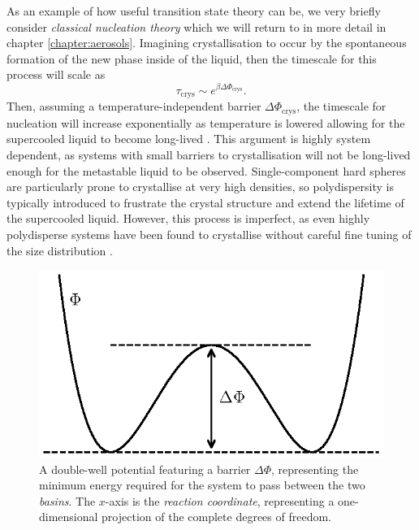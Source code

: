 \documentclass[11pt,twoside]{report}
\begin{document}
As an example of how useful transition state theory can be, we very briefly consider \emph{classical nucleation theory} which we will return to in more detail in chapter \ref{chapter:aerosols}.
Imagining crystallisation to occur by the spontaneous formation of the new phase inside of the liquid, then the timescale for this process will scale as
\begin{equation*}
  \tau_\mathrm{crys} \sim e^{ \beta \Delta \Phi_\mathrm{crys}}.
\end{equation*}
Then, assuming a temperature-independent barrier $\Delta \Phi_\mathrm{crys}$, the timescale for nucleation will increase exponentially as temperature is lowered allowing for the supercooled liquid to become long-lived%
\cite{CavagnaPR2009}.
This argument is highly system dependent, as systems with small barriers to crystallisation will not be long-lived enough for the metastable liquid to be observed.
Single-component hard spheres are particularly prone to crystallise at very high densities, so polydispersity is typically introduced to frustrate the crystal structure and extend the lifetime of the supercooled liquid.
However, this process is imperfect, as even highly polydisperse systems have been found to crystallise without careful fine tuning of the size distribution \cite{BommineniPRL2019,BerthierPRL2016}.

\begin{figure}
  \includegraphics[width=0.7\linewidth,center]{transition-state}
  \caption[A double-well potential illustrating transition state theory]{
    A double-well potential featuring a barrier $\Delta\Phi$, representing the minimum energy required for the system to pass between the two \emph{basins}.
    The $x$-axis is the \emph{reaction coordinate}, representing a one-dimensional projection of the complete degrees of freedom.
  }
  \label{fig:transition-state}
\end{figure}
\end{document}
